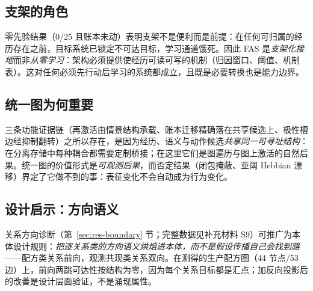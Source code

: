 \documentclass[10pt,a4paper]{ctexart}
\begin{document}
\subsection{支架的角色}
零先验结果（0/25 且账本未动）表明支架不是便利而是前提：在任何可归属的经历存在之前，目标系统已锁定不可达目标，学习通道饿死。因此 FAS 是\emph{支架化接地}而非\emph{从零学习}：架构必须提供使经历可读可写的机制（归因窗口、阈值、机制表）。这对任何必须先行动后学习的系统都成立，且既是必要转换也是能力边界。

\subsection{统一图为何重要}
三条功能证据链（再激活由情景结构承载、账本迁移精确落在共享候选上、极性槽边经抑制翻转）之所以存在，是因为经历、语义与动作候选\emph{共享同一可寻址结构}：在分离存储中每种耦合都需要定制桥接；在这里它们是图遍历与图上激活的自然后果。统一图的价值形式是\emph{可观测后果}，而否定结果（闭包掩蔽、亚阈 Hebbian 漂移）界定了它做不到的事：表征变化不会自动成为行为变化。

\subsection{设计启示：方向语义}
关系方向诊断（第~\ref{sec:res-boundary} 节；完整数据见补充材料 S9）可推广为本体设计规则：\emph{把逐关系类的方向语义烘焙进本体，而不是假设传播自己会找到路}——配方类关系前向，观测共现类关系双向。在测得的生产配方图（44 节点/53 边）上，前向两跳可达性按结构为零，因为每个关系目标都是汇点；加反向投影后的改善是设计层面验证，不是涌现属性。
\end{document}
